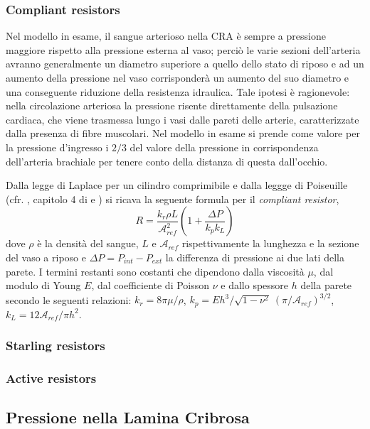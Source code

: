 \documentclass{article}
\begin{document}
\subsubsection*{Compliant resistors}
Nel modello in esame, il sangue arterioso nella CRA è sempre a pressione maggiore rispetto alla pressione esterna al vaso; perciò le varie sezioni dell'arteria avranno generalmente un diametro superiore a quello dello stato di riposo e ad un aumento della pressione nel vaso corrisponderà un aumento del suo diametro e una conseguente riduzione della resistenza idraulica.
Tale ipotesi è ragionevole: nella circolazione arteriosa la pressione risente direttamente della pulsazione cardiaca, che viene trasmessa lungo i vasi dalle pareti delle arterie, caratterizzate dalla presenza di fibre muscolari.
Nel modello in esame si prende come valore per la pressione d'ingresso  i $2/3$ del valore della pressione in corrispondenza dell'arteria brachiale per tenere conto della distanza di questa dall'occhio.

Dalla legge di Laplace per un cilindro comprimibile e dalla leggge di Poiseuille (cfr. \cite{art1}, capitolo 4 di \cite{notes} e \cite{Libro}) si ricava la seguente formula per il \textit{compliant resistor},
\begin{equation}
R = \frac{k_r \rho L}{\mathcal{A}_{ref}^2}\left( 1 + \frac{\Delta P}{k_p k_L}\right)
\label{compliantR}
\end{equation}
dove $\rho$ è la densità del sangue, $L$ e $\mathcal{A}_{ref}$ rispettivamente la lunghezza e la sezione del vaso a riposo e $\Delta P = P_{int} - P_{ext}$ la differenza di pressione ai due lati della parete.
I termini restanti sono costanti che dipendono dalla viscosità $\mu$, dal modulo di Young $E$, dal coefficiente di Poisson $\nu$ e dallo spessore $h$ della parete secondo le seguenti relazioni: $k_r = 8 \pi \mu / \rho$, $k_p = E h^3 / \sqrt{1 - \nu^2}\  (\pi/\mathcal{A}_{ref})^{3/2}$, $k_L = 12 \mathcal{A}_{ref} / \pi h^2$.
\subsubsection*{Starling resistors}
\subsubsection*{Active resistors}

\subsection{Pressione nella Lamina Cribrosa}
\end{document}
